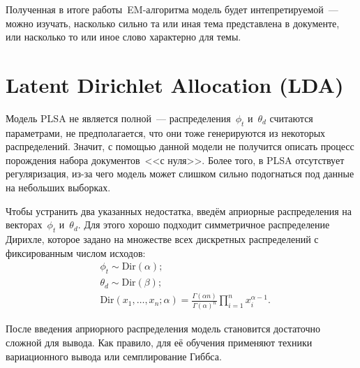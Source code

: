 \documentclass[12pt,fleqn]{article}
\begin{document}
Полученная в итоге работы~EM-алгоритма модель будет интепретируемой~---
можно изучать, насколько сильно та или иная тема представлена в документе,
или насколько то или иное слово характерно для темы.

\section{Latent Dirichlet Allocation (LDA)}

Модель PLSA не является полной~--- распределения~$\phi_t$ и~$\theta_d$
считаются параметрами, не предполагается, что они тоже генерируются из некоторых распределений.
Значит, с помощью данной модели не получится описать процесс порождения
набора документов~<<с нуля>>.
Более того, в PLSA отсутствует регуляризация, из-за чего модель
может слишком сильно подогнаться под данные на небольших выборках.

Чтобы устранить два указанных недостатка, введём априорные распределения на
векторах~$\phi_t$ и~$\theta_d$.
Для этого хорошо подходит симметричное распределение Дирихле,
которое задано на множестве всех дискретных распределений с фиксированным числом исходов:
\begin{align*}
    &\phi_t \sim \text{Dir}(\alpha);\\
    &\theta_d \sim \text{Dir}(\beta);\\
    &\text{Dir}(x_1, \dots, x_n; \alpha)
    =
    \frac{\Gamma(\alpha n)}{\Gamma(\alpha)^n}
    \prod_{i = 1}^{n}
        x_i^{\alpha - 1}.
\end{align*}

После введения априорного распределения модель становится достаточно сложной для вывода.
Как правило, для её обучения применяют техники вариационного вывода или семплирование Гиббса.
\end{document}

